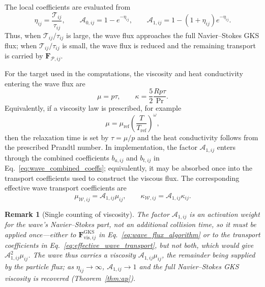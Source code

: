 \documentclass[preprint,12pt]{elsarticle}
\newtheorem{remark}{Remark}
\begin{document}
The local coefficients are evaluated from
\begin{equation}\label{eq:algorithm_A01}
    \eta_{ij}=\frac{\mathcal{T}_{ij}}{\tau_{ij}},\qquad
    \mathcal A_{0,ij}=1-e^{-\eta_{ij}},\qquad
    \mathcal A_{1,ij}=1-(1+\eta_{ij})e^{-\eta_{ij}} .
\end{equation}
Thus, when $\mathcal{T}_{ij}/\tau_{ij}$ is large, the wave flux approaches the full Navier--Stokes GKS flux; when $\mathcal{T}_{ij}/\tau_{ij}$ is small, the wave flux is reduced and the remaining transport is carried by $\mathbf F_{\mathcal{P},ij}$.

For the target used in the computations, the viscosity and heat conductivity entering the wave flux are
\begin{equation}\label{eq:algorithm_transport_coeff}
    \mu=p\tau,\qquad
    \kappa=\frac{5}{2}\frac{Rp\tau}{\Pr}.
\end{equation}
Equivalently, if a viscosity law is prescribed, for example
\begin{equation}\label{eq:viscosity_law}
    \mu=\mu_{\mathrm{ref}}\left(\frac{T}{T_{\mathrm{ref}}}\right)^\omega ,
\end{equation}
then the relaxation time is set by $\tau=\mu/p$ and the heat conductivity follows from the prescribed Prandtl number. In implementation, the factor $\mathcal A_{1,ij}$ enters through the combined coefficients $b_{a,ij}$ and $b_{t,ij}$ in Eq.~\eqref{eq:wave_combined_coeffs}; equivalently, it may be absorbed once into the transport coefficients used to construct the viscous flux. The corresponding effective wave transport coefficients are
\begin{equation}\label{eq:effective_wave_transport}
    \mu_{\mathcal{W},ij}=\mathcal A_{1,ij}\mu_{ij},\qquad
    \kappa_{\mathcal{W},ij}=\mathcal A_{1,ij}\kappa_{ij}.
\end{equation}

\begin{remark}[Single counting of viscosity]
The factor $\mathcal A_{1,ij}$ is an activation weight for the wave's Navier--Stokes part, not an additional collision time, so it must be applied once---either to $\mathbf F_{\mathrm{vis},ij}^{\mathrm{GKS}}$ in Eq.~\eqref{eq:wave_flux_algorithm} or to the transport coefficients in Eq.~\eqref{eq:effective_wave_transport}, but not both, which would give $\mathcal A_{1,ij}^2\mu_{ij}$. The wave thus carries a viscosity $\mathcal A_{1,ij}\mu_{ij}$, the remainder being supplied by the particle flux; as $\eta_{ij}\to\infty$, $\mathcal A_{1,ij}\to1$ and the full Navier--Stokes GKS viscosity is recovered (Theorem~\ref{thm:ap}).
\end{remark}
\end{document}
